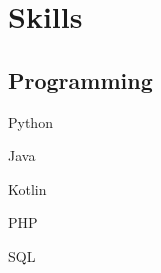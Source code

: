 \documentclass[]{abhijeet_viswa-deedy-resume-openfont}
\begin{document}
\begin{minipage}[t]{0.25\textwidth}
%


\section{Skills}
\subsection{Programming}
\begin{itemize*}
 \item Python
 \item Java
 \item Kotlin
 \item PHP
 \item SQL
\end{itemize*}
\subsectionsep


\end{minipage}
\end{document}
